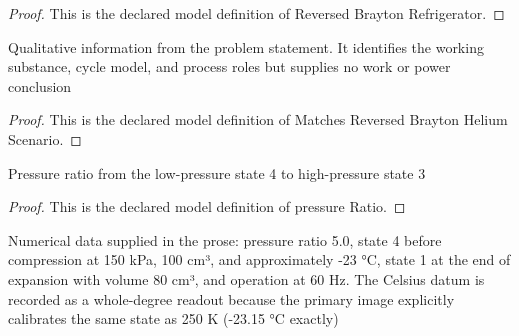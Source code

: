 \begin{proof}
  This is the declared model definition of Reversed Brayton Refrigerator.
\end{proof}
\begin{definition}
  \label{def:physics:phyx-mini-0481:phyxminiproblems-problemphyxmini0481-matchesreversedbraytonheliumscenario}
  Qualitative information from the problem statement. It identifies the working substance, cycle model, and process roles but supplies no work or power conclusion
\end{definition}
\begin{proof}
  This is the declared model definition of Matches Reversed Brayton Helium Scenario.
\end{proof}
\begin{definition}
  \label{def:physics:phyx-mini-0481:phyxminiproblems-problemphyxmini0481-pressureratio}
  Pressure ratio from the low-pressure state 4 to high-pressure state 3
\end{definition}
\begin{proof}
  This is the declared model definition of pressure Ratio.
\end{proof}
\begin{definition}
  \label{def:physics:phyx-mini-0481:phyxminiproblems-problemphyxmini0481-matchesproblemreadouts}
  Numerical data supplied in the prose: pressure ratio 5.0, state 4 before compression at 150 kPa, 100 cm³, and approximately -23 °C, state 1 at the end of expansion with volume 80 cm³, and operation at 60 Hz. The Celsius datum is recorded as a whole-degree readout because the primary image explicitly calibrates the same state as 250 K (-23.15 °C exactly)
\end{definition}

